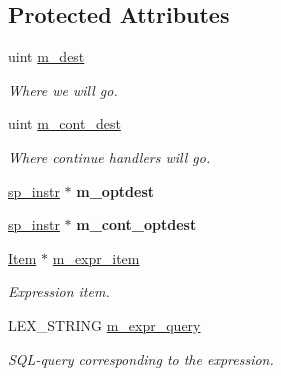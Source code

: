 \subsection*{Protected Attributes}
\begin{DoxyCompactItemize}
\item 
\mbox{\label{classsp__lex__branch__instr_a419b39ebb1fc5a42a616d60a8b9b706b}} 
uint \mbox{\hyperlink{classsp__lex__branch__instr_a419b39ebb1fc5a42a616d60a8b9b706b}{m\+\_\+dest}}
\begin{DoxyCompactList}\small\item\em Where we will go. \end{DoxyCompactList}\item 
\mbox{\label{classsp__lex__branch__instr_a596a77218fe106f86f03774b05833c6e}} 
uint \mbox{\hyperlink{classsp__lex__branch__instr_a596a77218fe106f86f03774b05833c6e}{m\+\_\+cont\+\_\+dest}}
\begin{DoxyCompactList}\small\item\em Where continue handlers will go. \end{DoxyCompactList}\item 
\mbox{\label{classsp__lex__branch__instr_a5ed07ac6ab451f947115b3a7317bf3be}} 
\mbox{\hyperlink{classsp__instr}{sp\+\_\+instr}} $\ast$ {\bfseries m\+\_\+optdest}
\item 
\mbox{\label{classsp__lex__branch__instr_a1b1fe2d6ea73fb04154f259b75f5fc29}} 
\mbox{\hyperlink{classsp__instr}{sp\+\_\+instr}} $\ast$ {\bfseries m\+\_\+cont\+\_\+optdest}
\item 
\mbox{\label{classsp__lex__branch__instr_abd90bac62d885b3f41a96a401e470f65}} 
\mbox{\hyperlink{classItem}{Item}} $\ast$ \mbox{\hyperlink{classsp__lex__branch__instr_abd90bac62d885b3f41a96a401e470f65}{m\+\_\+expr\+\_\+item}}
\begin{DoxyCompactList}\small\item\em Expression item. \end{DoxyCompactList}\item 
\mbox{\label{classsp__lex__branch__instr_a76410fa6cec7a8b4a57151c75bd64586}} 
L\+E\+X\+\_\+\+S\+T\+R\+I\+NG \mbox{\hyperlink{classsp__lex__branch__instr_a76410fa6cec7a8b4a57151c75bd64586}{m\+\_\+expr\+\_\+query}}
\begin{DoxyCompactList}\small\item\em S\+QL-\/query corresponding to the expression. \end{DoxyCompactList}\end{DoxyCompactItemize}
